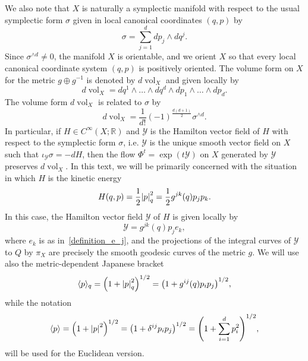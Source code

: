 \documentclass[AHL,Unicode,longabstracts]{cedram}
\newcommand{\R}{\mathbb{R}}
\newcommand{\clY}{\mathcal{Y}}
\DeclareMathOperator{\voll}{vol}
\newcommand{\abs}[1]{\left| #1 \right|}
\let\originalleft\left
\let\originalright\right
\renewcommand{\left}{\mathopen{}\mathclose\bgroup\originalleft}
\renewcommand{\right}{\aftergroup\egroup\originalright}
\begin{document}
We also note that $X$ is naturally a symplectic manifold with respect to the usual symplectic form $\sigma$ given in local canonical coordinates $(q,p)$ by
\begin{equation}\label{standard_symplectic_form}
\sigma = \sum_{j=1}^d dp_j \wedge dq^j.
\end{equation}
Since $\sigma^{\wedge d} \neq 0$, the manifold $X$ is orientable, and we orient $X$ so that every local canonical coordinate system $(q,p)$ is positively oriented. The volume form on $X$ for the metric $g \oplus g^{-1}$ is denoted by $d\voll_X$ and given locally by
\begin{equation}
d\voll_X = dq^1 \wedge \dots \wedge dq^d \wedge dp_1 \wedge \dots \wedge dp_d.
\end{equation}
The volume form $d\voll_X$ is related to $\sigma$ by
\begin{equation}
d \voll_X = \frac{1}{d!}(-1)^\frac{d(d+1)}{2} \sigma^{\wedge d}.
\end{equation}
In particular, if $H \in C^\infty(X; \R)$ and $\clY$ is the Hamilton vector field of $H$ with respect to the symplectic form $\sigma$, i.e. $\clY$ is the unique smooth vector field on $X$ such that $\iota_{\clY} \sigma = -dH$, then the flow $\Phi^t = \exp{(t\clY)}$ on $X$ generated by $\clY$ preserves $d\voll_X$. In this text, we will be primarily concerned with the situation in which $H$ is the kinetic energy
\begin{equation}\label{kinetic_energy}
H(q,p) = \frac{1}{2} \abs{p}^2_{q} = \frac{1}{2} g^{jk}(q)p_j p_k.
\end{equation}
In this case, the Hamilton vector field $\clY$ of $H$ is given locally by
\begin{equation}
\clY = g^{jk}(q) p_j e_k,
\end{equation}
where $e_k$ is as in~\eqref{definition_e_j}, and the projections of the integral curves of $\clY$ to $Q$ by $\pi_X$ are precisely the smooth geodesic curves of the metric $g$. We will use also the metric-dependent Japanese bracket
\begin{equation}
\langle p \rangle_q = \left(1 + \abs{p}^2_{q}\right)^{1/2}=\left(1+g^{ij}(q)p_i p_j\right)^{1/2},
\end{equation}
while the notation
\begin{equation}
\langle p \rangle = \left(1 + \abs{p}^2\right)^{1/2}=\left(1+\delta^{ij}p_i p_j\right)^{1/2}=\left(1+\sum_{i=1}^{d}p_{i}^{2}\right)^{1/2},
\end{equation}
will be used for the Euclidean version.
\end{document}
